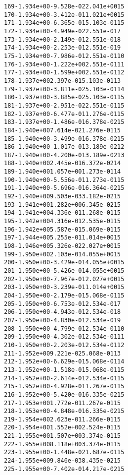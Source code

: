 \begin{alltt}
 169  -1.934e+00  -9.528e-02   2.041e+00   15
 170  -1.934e+00  -3.412e-01   1.021e+00   15
 171  -1.934e+00  -6.365e-01   5.103e-01   15
 172  -1.934e+00  -4.949e-02   2.551e-01    7
 173  -1.934e+00  -2.149e-01   2.551e-01    8
 174  -1.934e+00  -2.253e-01   2.551e-01    9
 175  -1.934e+00  -7.986e-01   2.551e-01   10
 176  -1.934e+00  -1.222e+00   2.551e-01   11
 177  -1.934e+00  -1.599e+00   2.551e-01   12
 178  -1.937e+00   2.397e-01   5.103e-01   13
 179  -1.937e+00  -3.811e-02   5.103e-01   14
 180  -1.937e+00  -3.885e-02   5.103e-01   15
 181  -1.937e+00  -2.951e-02   2.551e-01   15
 182  -1.937e+00  -6.477e-01   1.276e-01   15
 183  -1.937e+00  -1.486e-01   6.378e-02   15
 184  -1.940e+00   7.614e-02   1.276e-01   15
 185  -1.940e+00  -3.499e-01   6.378e-02   15
 186  -1.940e+00  -1.017e-01   3.189e-02   12
 187  -1.940e+00  -4.200e-01   3.189e-02   13
 188  -1.940e+00   2.445e-01   6.372e-02   14
 189  -1.940e+00   1.057e+00   1.273e-01   14
 190  -1.940e+00  -5.556e-01   1.273e-01   15
 191  -1.940e+00  -5.696e-01   6.364e-02   15
 192  -1.940e+00   9.503e-03   3.182e-02   15
 193  -1.941e+00   1.282e+00   6.345e-02   15
 194  -1.941e+00   4.336e-01   1.268e-01   15
 195  -1.942e+00   4.316e-01   2.535e-01   15
 196  -1.942e+00   5.587e-01   5.069e-01   15
 197  -1.944e+00   5.255e-01   1.014e+00   15
 198  -1.946e+00   5.326e-02   2.027e+00   15
 199  -1.950e+00   2.103e-01   4.055e+00   15
 200  -1.950e+00  -3.429e-01   4.055e+00   15
 201  -1.950e+00  -5.426e-01   4.055e+00   15
 202  -1.950e+00  -7.967e-01   2.027e+00   15
 203  -1.950e+00  -3.239e-01   1.014e+00   15
 204  -1.950e+00  -2.179e-01   5.068e-01   15
 205  -1.950e+00  -6.753e-01   2.534e-01    7
 206  -1.950e+00  -4.943e-01   2.534e-01    8
 207  -1.950e+00  -4.830e-01   2.534e-01    9
 208  -1.950e+00  -4.799e-01   2.534e-01   10
 209  -1.950e+00  -4.302e-01   2.534e-01   11
 210  -1.950e+00  -2.203e-01   2.534e-01   12
 211  -1.952e+00   9.221e-02   5.068e-01   13
 212  -1.952e+00  -6.629e-01   5.068e-01   14
 213  -1.952e+00  -1.518e-01   5.068e-01   15
 214  -1.952e+00  -2.614e-01   2.534e-01   15
 215  -1.952e+00  -4.928e-01   1.267e-01   15
 216  -1.952e+00  -5.420e-01   6.335e-02   15
 217  -1.953e+00   1.772e-01   1.267e-01   15
 218  -1.953e+00  -4.848e-01   6.335e-02   15
 219  -1.954e+00   2.623e-01   1.266e-01   15
 220  -1.954e+00   1.552e+00   2.524e-01   15
 221  -1.955e+00   1.507e+00   3.374e-01   15
 222  -1.955e+00   8.118e+00   3.374e-01   15
 223  -1.955e+00  -1.448e-02   1.687e-01   15
 224  -1.955e+00   9.846e-03   8.435e-02   15
 225  -1.955e+00  -7.402e-01   4.217e-02   15

\end{alltt}
